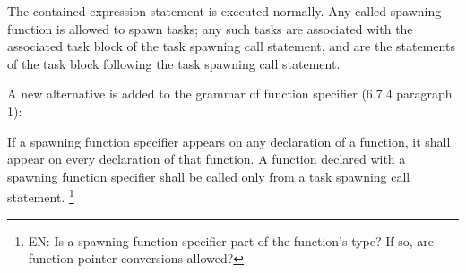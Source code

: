 \pnum
The contained expression statement is executed normally.
Any called spawning function is allowed to spawn tasks;
any such tasks are associated with the associated task block
of the task spawning call statement,
and are
the statements of the task block
following the task spawning call statement.

\begin{note}
\end{note}

\pnum
A new alternative is added to the grammar of function specifier
(6.7.4 paragraph 1):

\begin{bnf}
\br
{} 
\end{bnf}

\pnum
If a spawning function specifier appears
on any declaration of a function,
it shall appear on every declaration of that function.
A function declared with a spawning function specifier
shall be called only from a task spawning call statement.
\footnote{EN:
Is a spawning function specifier part of the function's type?
If so, are function-pointer conversions allowed?
}